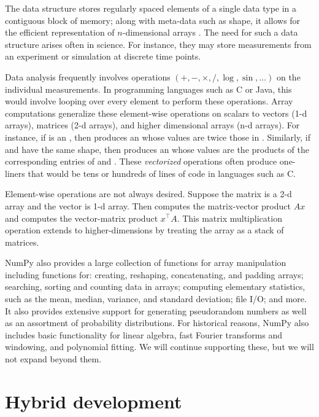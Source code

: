 The  data structure stores regularly spaced elements of a single
data type in a contiguous block of memory; along with meta-data such as shape,
it allows for the efficient representation of $n$-dimensional arrays \cite{vanderwalt2011numpy}.
The need for such a data structure arises often in science.
For instance, they may store measurements from an experiment or simulation
at discrete time points.

Data analysis frequently involves operations $(+, -, \times, /, \log, \sin, \dots)$ on
the individual measurements.
In programming languages such as C or Java, this would involve looping over
every element to perform these operations.
Array computations generalize these element-wise operations on scalars to
vectors (1-d arrays), matrices (2-d arrays), and higher dimensional arrays (n-d
arrays).
For instance, if  is an , then  produces
an  whose values are twice those in .
Similarly, if  and  have the same shape, then
 produces an  whose values are the products of
the corresponding entries of  and .
These \emph{vectorized} operations often produce one-liners that would be tens
or hundreds of lines of code in languages such as C.

Element-wise operations are not always desired.
Suppose the matrix  is a 2-d array and the vector  is 1-d array.
Then  computes the matrix-vector product $Ax$ and
 computes the vector-matrix product $x^\top A$.
This matrix multiplication operation extends to higher-dimensions by
treating the array as a stack of matrices.

NumPy also provides a large collection of functions for array manipulation
including functions for: creating, reshaping, concatenating, and padding arrays;
searching, sorting and counting data
in arrays; computing elementary statistics, such as the mean, median,
variance, and standard deviation; file I/O; and more.
It also provides extensive support for generating pseudorandom numbers
as well as an assortment of probability distributions.
For historical reasons, NumPy also includes basic functionality for
linear algebra, fast Fourier transforms and windowing,
and polynomial fitting.
We will continue supporting these, but we will not expand beyond them.

\section*{Hybrid development}

